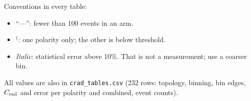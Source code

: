 \documentclass[11pt]{article}
\newcommand{\crad}{C_{\rm rad}}
\begin{document}
Conventions in every table:
\begin{itemize}
\item ``---'': fewer than 100 events in an arm.
\item $^\dagger$: one polarity only; the other is below threshold.
\item \textit{Italic}: statistical error above 10\%. That is not a measurement; use a coarser bin.
\end{itemize}
All values are also in \texttt{crad\_tables.csv} (232 rows: topology, binning, bin edges, $\crad$ and error per polarity
and combined, event counts).

\begin{table}[H]\centering\small

\caption{$\crad$ in M.~Tenorio's hard $W$ bins, $Q^2$ 0.02--0.12 (Table~6 of the analysis note). These are the factors for the $W$-dependent yields.}
\label{tab:hardW}
\end{table}
\begin{table}[H]\centering\small

\caption{$\crad$ in the effective $(W,Q^2)$ windows of the analysis note: Table~13 for $e'e^+e^-$, Table~17 for $e'e^+e^-p'$.}
\label{tab:eff}
\end{table}
\begin{table}[H]\centering\small

\caption{$\crad$ in M.~Tenorio's $Q^2$ bins (Table~21 of the analysis note), in its single $W$ bin 4.20--4.35~GeV
(Sec.~10 and Fig.~38 of the note). These are the factors for the $Q^2$ dependence (Tables~22--23 of the note).}
\label{tab:Q2}
\end{table}
\begin{table}[H]\centering\small

\caption{$\crad$ on the two-dimensional grid of M.~Tenorio's $W$ bins $\times$ $Q^2$ bins. ``---'': fewer than 100 events per arm. The
cell $Q^2$ 0.06--0.11, $W$ 4.40--4.48 is kinematically closed: with the FT limit $\theta_e<6.45^\circ$ at 10.6~GeV,
$Q^2_{\max}$ falls from 0.094 at $W=4.40$ to 0.047~GeV$^2$ at 4.48. M.~Tenorio's F18 data have no $J/\psi$ there either
(0 events in 2.95--3.20~GeV, inbending and outbending). The note's $Q^2$ analysis does not use this cell; it takes
$W$ 4.20--4.35 (Table~\ref{tab:Q2}).}
\label{tab:WQ2}
\end{table}
\end{document}

